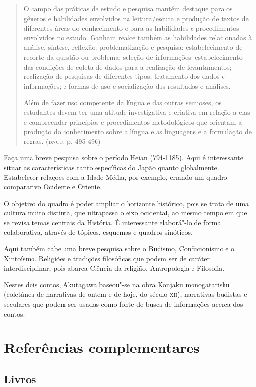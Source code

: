 \documentclass[12pt]{extarticle}
\begin{document}
\begin{quote}
O campo das práticas de estudo e pesquisa mantém destaque para os
gêneros e habilidades envolvidos na leitura/escuta e produção de textos
de diferentes áreas do conhecimento e para as habilidades e
procedimentos envolvidos no estudo. Ganham realce também as habilidades
relacionadas à análise, síntese, reflexão, problematização e pesquisa:
estabelecimento de recorte da questão ou problema; seleção de
informações; estabelecimento das condições de coleta de dados para a
realização de levantamentos; realização de pesquisas de diferentes
tipos; tratamento dos dados e informações; e formas de uso e
socialização dos resultados e análises.

Além de fazer uso competente da língua e das outras semioses, os
estudantes devem ter uma atitude investigativa e criativa em relação a
elas e compreender princípios e procedimentos metodológicos que orientam
a produção do conhecimento sobre a língua e as linguagens e a formulação
de regras. (\textsc{bncc}, p. 495-496)
\end{quote}

Faça uma breve pesquisa sobre o período Heian (794-1185). Aqui é
interessante situar as características tanto específicas do Japão
quanto globalmente. Estabelecer relações com a Idade Média, por
exemplo, criando um quadro comparativo Ocidente e Oriente.

O objetivo do quadro é poder ampliar o horizonte histórico, pois se
trata de uma cultura muito distinta, que ultrapassa o eixo ocidental, ao
mesmo tempo em que se revisa temas centrais da História. É interessante
elaborá"-lo de forma colaborativa, através de tópicos, esquemas e quadros
sinóticos.

Aqui também cabe uma breve pesquisa sobre o Budismo, Confucionismo e o
Xintoísmo. Religiões e tradições filosóficas que podem ser de caráter
interdisciplinar, pois abarca Ciência da religião, Antropologia e
Filosofia.

Nestes dois contos, Akutagawa baseou"-se na obra Konjaku monogatarishu
(coletânea de narrativas de ontem e de hoje, do século \textsc{xii}), narrativas
budistas e seculares que podem ser usadas como fonte de busca de
informações acerca dos contos.

\section{Referências complementares}

\subsection{Livros}
\end{document}

